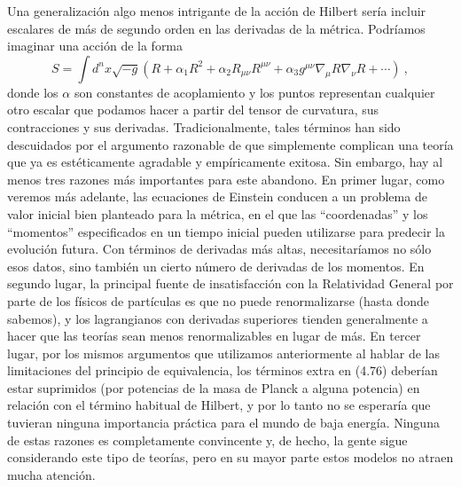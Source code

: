 \documentclass[11pt,b5paper,openany,twoside]{book}
\newcommand{\mn}{{\mu\nu}}
\def\g{{\sqrt{-g}}}
\begin{document}
Una generalización algo menos intrigante de la acción de Hilbert sería incluir escalares de más de segundo orden en las derivadas de la métrica.
Podríamos imaginar una acción de la forma
\begin{equation}
S = \int d^nx \g (R + \alpha_1 R^2 + \alpha_2 R_\mn R^\mn
+\alpha_3 g^\mn \nabla_\mu R \nabla_\nu R +\cdots)\ ,\label{4.76}
\end{equation}
donde los $\alpha$ son constantes de acoplamiento y los puntos representan cualquier otro escalar que podamos hacer a partir del tensor de curvatura, sus contracciones y sus derivadas.
Tradicionalmente, tales términos han sido descuidados por el argumento razonable de que simplemente complican una teoría que ya es estéticamente agradable y empíricamente exitosa.
Sin embargo, hay al menos tres razones más importantes para este abandono.
En primer lugar, como veremos más adelante, las ecuaciones de Einstein conducen a un problema de valor inicial bien planteado para la métrica, en el que las ``coordenadas'' y los ``momentos'' especificados en un tiempo inicial pueden utilizarse para predecir la evolución futura.
Con términos de derivadas más altas, necesitaríamos no sólo esos datos, sino también un cierto número de derivadas de los momentos.
En segundo lugar, la principal fuente de insatisfacción con la Relatividad General por parte de los físicos de partículas es que no puede renormalizarse (hasta donde sabemos), y los lagrangianos con derivadas superiores tienden generalmente a hacer que las teorías sean menos renormalizables en lugar de más.
En tercer lugar, por los mismos argumentos que utilizamos anteriormente al hablar de las limitaciones del principio de equivalencia, los términos extra en (4.76) deberían estar suprimidos (por potencias de la masa de Planck a alguna potencia) en relación con el término habitual de Hilbert, y por lo tanto no se esperaría que tuvieran ninguna importancia práctica para el mundo de baja energía.
Ninguna de estas razones es completamente convincente y, de hecho, la gente sigue considerando este tipo de teorías, pero en su mayor parte estos modelos no atraen mucha atención.
\end{document}
